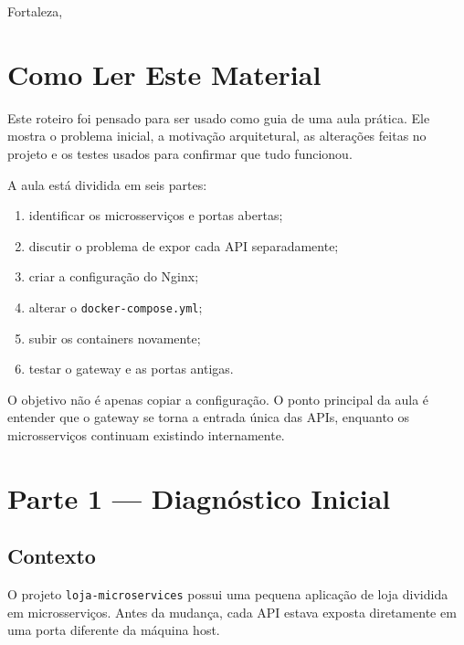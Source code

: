 \documentclass[12pt,a4paper]{article}
\begin{document}
\begin{titlepage}
  \vfill
  {\large Fortaleza, \the\year}
\end{titlepage}

\tableofcontents
\newpage

\section{Como Ler Este Material}

Este roteiro foi pensado para ser usado como guia de uma aula pr\'atica. Ele mostra o problema inicial, a motiva\c{c}\~ao arquitetural, as altera\c{c}\~oes feitas no projeto e os testes usados para confirmar que tudo funcionou.

\begin{infobox}
  A aula est\'a dividida em seis partes:
  \begin{enumerate}[leftmargin=2em]
    \item identificar os microsservi\c{c}os e portas abertas;
    \item discutir o problema de expor cada API separadamente;
    \item criar a configura\c{c}\~ao do Nginx;
    \item alterar o \texttt{docker-compose.yml};
    \item subir os containers novamente;
    \item testar o gateway e as portas antigas.
  \end{enumerate}
\end{infobox}

\begin{alertbox}
  O objetivo n\~ao \'e apenas copiar a configura\c{c}\~ao. O ponto principal da aula \'e entender que o gateway se torna a entrada \'unica das APIs, enquanto os microsservi\c{c}os continuam existindo internamente.
\end{alertbox}

\section{Parte 1 --- Diagn\'ostico Inicial}

\subsection{Contexto}

O projeto \texttt{loja-microservices} possui uma pequena aplica\c{c}\~ao de loja dividida em microsservi\c{c}os. Antes da mudan\c{c}a, cada API estava exposta diretamente em uma porta diferente da m\'aquina host.
\end{document}
